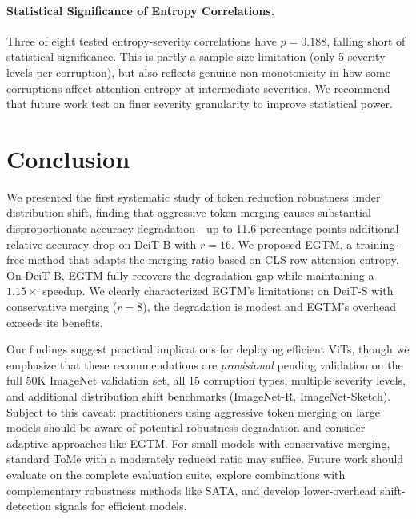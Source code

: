 \documentclass{article}
\newcommand{\ours}{EGTM}
\begin{document}
\paragraph{Statistical Significance of Entropy Correlations.}
Three of eight tested entropy-severity correlations have $p = 0.188$, falling short of statistical significance. This is partly a sample-size limitation (only 5 severity levels per corruption), but also reflects genuine non-monotonicity in how some corruptions affect attention entropy at intermediate severities. We recommend that future work test on finer severity granularity to improve statistical power.

\section{Conclusion}

We presented the first systematic study of token reduction robustness under distribution shift, finding that aggressive token merging causes substantial disproportionate accuracy degradation---up to 11.6 percentage points additional relative accuracy drop on DeiT-B with $r{=}16$. We proposed \ours{}, a training-free method that adapts the merging ratio based on CLS-row attention entropy. On DeiT-B, \ours{} fully recovers the degradation gap while maintaining a $1.15\times$ speedup. We clearly characterized \ours{}'s limitations: on DeiT-S with conservative merging ($r{=}8$), the degradation is modest and \ours{}'s overhead exceeds its benefits.

Our findings suggest practical implications for deploying efficient ViTs, though we emphasize that these recommendations are \emph{provisional} pending validation on the full 50K ImageNet validation set, all 15 corruption types, multiple severity levels, and additional distribution shift benchmarks (ImageNet-R, ImageNet-Sketch). Subject to this caveat: practitioners using aggressive token merging on large models should be aware of potential robustness degradation and consider adaptive approaches like \ours{}. For small models with conservative merging, standard ToMe with a moderately reduced ratio may suffice. Future work should evaluate on the complete evaluation suite, explore combinations with complementary robustness methods like SATA, and develop lower-overhead shift-detection signals for efficient models.
\end{document}

